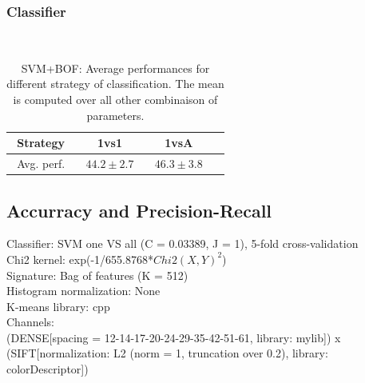 \documentclass[10pt,a4paper]{llncs}
\begin{document}
\subsubsection{Classifier}$~$\\

\begin{table}[H]
\centering
\caption{SVM+BOF: Average performances for different strategy of classification. The mean is computed over all other combinaison of parameters.}
\label{table:SVM_BOF:Classifier}
\begin{tabular}{|l|c|c|c|}
\hline
$~~$Strategy & 1vs1 & 1vsA \\ \hline
$~~$Avg. perf.$~~$ & $~~44.2 \pm 2.7~~$ & $~~\mathbf{46.3 \pm 3.8}~~$ \\ \hline
\end{tabular}
\end{table}

\subsection{Accurracy and Precision-Recall}

Classifier: SVM one VS all (C = 0.03389, J = 1), 5-fold cross-validation\\
Chi2 kernel: exp(-1/655.8768*$Chi2(X,Y)^2$)\\
Signature: Bag of features (K = 512)\\
Histogram normalization: None\\
K-means library: cpp\\
Channels:\\
(DENSE[spacing = 12-14-17-20-24-29-35-42-51-61, library: mylib]) x (SIFT[normalization: L2 (norm = 1, truncation over 0.2), library: colorDescriptor])\\
\end{document}
